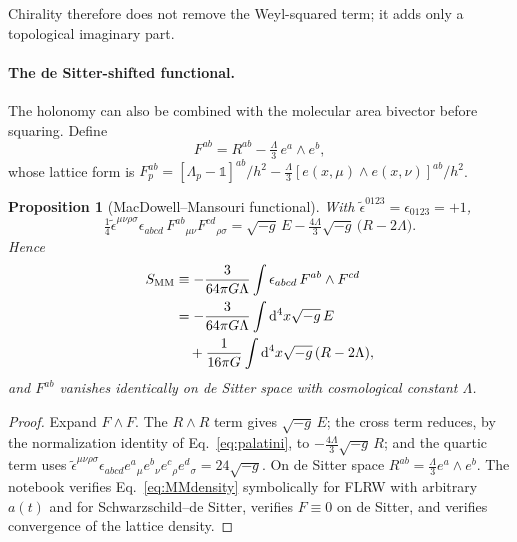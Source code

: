 \documentclass[reprint,aps,prd,amsmath,amssymb,superscriptaddress,nofootinbib,floatfix]{revtex4-2}
\theoremstyle{plain}
\newtheorem{proposition}{Proposition}
\theoremstyle{definition}
\theoremstyle{remark}
\newcommand{\dd}{\mathrm{d}}
\newcommand{\one}{\mathbb{1}}
\begin{document}
Chirality therefore does not remove the Weyl-squared term; it adds only a topological imaginary part.

\paragraph*{The de Sitter-shifted functional.} The holonomy can also be combined with the molecular area
bivector before squaring. Define
\begin{equation}
F^{ab}=R^{ab}-\tfrac{\Lambda}{3}\,e^a\wedge e^b ,
\label{eq:Fds}
\end{equation}
whose lattice form is $F^{ab}_p=[\Lambda_p-\one]^{ab}/h^2-\tfrac\Lambda3[e(x,\mu)\wedge e(x,\nu)]^{ab}/h^2$.

\begin{proposition}[MacDowell--Mansouri functional]
\label{prop:MM}
With $\tilde\epsilon^{0123}=\epsilon_{0123}=+1$,
\begin{equation}
\tfrac14\tilde\epsilon^{\mu\nu\rho\sigma}\epsilon_{abcd}\,F^{ab}{}_{\mu\nu}F^{cd}{}_{\rho\sigma}
=\sqrt{-g}\,E-\tfrac{4\Lambda}{3}\sqrt{-g}\,\big(R-2\Lambda\big).
\label{eq:MMdensity}
\end{equation}
Hence
\begin{equation}
\begin{aligned}
S_{\rm MM}&\equiv-\frac{3}{64\pi G\Lambda}\int\epsilon_{abcd}\,F^{ab}\wedge F^{cd}\\
&=-\frac{3}{64\pi G\Lambda}\int\dd^4x\sqrt{-g}\,E\\
&\quad+\frac{1}{16\pi G}\int\dd^4x\sqrt{-g}\,(R-2\Lambda),
\end{aligned}
\label{eq:SMM}
\end{equation}
and $F^{ab}$ vanishes identically on de Sitter space with cosmological constant $\Lambda$.
\end{proposition}
\begin{proof}
Expand $F\wedge F$. The $R\wedge R$ term gives $\sqrt{-g}\,E$; the cross term reduces, by the normalization
identity of Eq.~\eqref{eq:palatini}, to $-\tfrac{4\Lambda}{3}\sqrt{-g}\,R$; and the quartic term uses
$\tilde\epsilon^{\mu\nu\rho\sigma}\epsilon_{abcd}e^a{}_\mu e^b{}_\nu e^c{}_\rho e^d{}_\sigma=24\sqrt{-g}$. On de Sitter
space $R^{ab}=\tfrac\Lambda3e^a\wedge e^b$. The notebook verifies Eq.~\eqref{eq:MMdensity} symbolically for FLRW with
arbitrary $a(t)$ and for Schwarzschild--de Sitter, verifies $F\equiv0$ on de Sitter, and verifies convergence
of the lattice density.
\end{proof}
\end{document}
